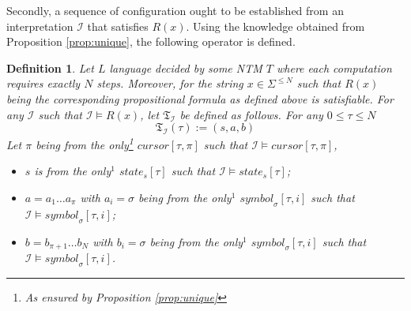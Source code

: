\documentclass [11pt]{article}
\newtheorem{definition}[theorem]{Definition}
\newcommand{\sym}[3]{\textit{symbol}_{#1}[#2,#3]}
\newcommand{\cursor}[2]{\textit{cursor}[#1,#2]}
\newcommand{\state}[2]{\textit{state}_{#1}[#2]}
\newcommand{\trans}[1]{\mathfrak{T}_{\mathcal{#1}}}
\begin{document}
Secondly, a sequence of configuration ought to be established from an interpretation $\mathcal{I}$ that satisfies $R(x)$. 
Using the knowledge obtained from Proposition \ref{prop:unique}, the following operator is defined.



\begin{definition}
\label{def:trans}
Let $L$ language decided by some NTM $T$ where each computation requires exactly $N$ steps. Moreover, for the string $x \in \Sigma^{\leq N}$ such that $R(x)$  being the corresponding propositional formula as defined above is satisfiable.  For any $\mathcal{I}$ such that $\mathcal{I} \models R(x)$, let $\trans{I}$ be defined as follows. For any $0 \leq \tau \leq N$
\begin{equation*}
\trans{I}(\tau):=(s,a,b)
\end{equation*}
Let $\pi$ being from the only\footnote{As ensured by Proposition \ref{prop:unique}} $\cursor{\tau}{\pi}$ such that $\mathcal{I}\models \cursor{\tau}{\pi}$, 
\begin{itemize}
\item $s$ is from the only$^1$ $\state{s}{\tau}$ such that $\mathcal{I}\models \state{s}{\tau}$;
\item $a = a_1 \dots a_{\pi}$ with $a_i=\sigma$ being from the only$^1$ $\sym{\sigma}{\tau}{i}$ such that $\mathcal{I}\models \sym{\sigma}{\tau}{i}$; 
\item $b = b_{\pi+1} \dots b_{N}$ with $b_i=\sigma$ being from the only$^1$  $\sym{\sigma}{\tau}{i}$ such that $\mathcal{I}\models \sym{\sigma}{\tau}{i}$.
\end{itemize}


\end{definition}
\end{document}
